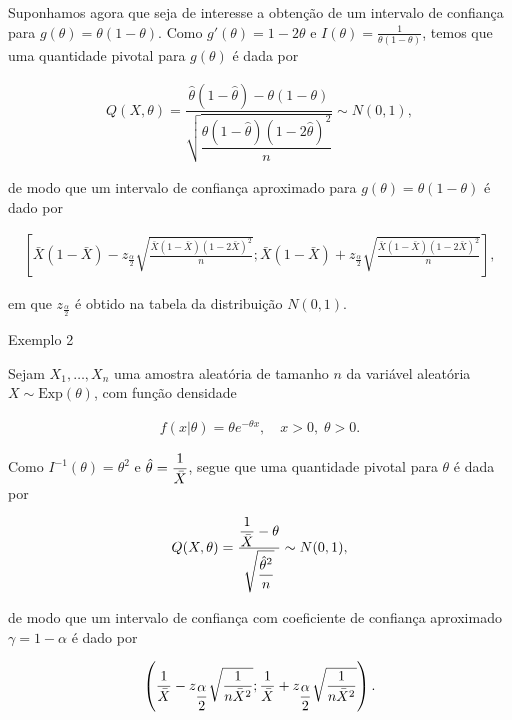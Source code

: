 \documentclass[12pt]{beamer}
\begin{document}
\begin{frame}{}
\begin{block}{}
\justifying
Suponhamos agora que seja de interesse a obtenção de um intervalo de confiança para $g(\theta) = \theta(1 - \theta)$. Como $g'(\theta) = 1 - 2\theta$ e $I(\theta) = \frac{1}{\theta(1 - \theta)}$, temos que uma quantidade pivotal para $g(\theta)$ é dada por

\begin{align*}
Q(X, \theta) = \dfrac{\hat{\theta}(1 - \hat{\theta}) - \theta(1 - \theta)}{\sqrt{\dfrac{\hat{\theta}(1-\hat{\theta})(1-2\hat{\theta})^2}{n}}} \sim N(0, 1),
\end{align*}

de modo que um intervalo de confiança aproximado para $g(\theta) = \theta(1-\theta)$ é dado por

{\footnotesize
\begin{align*}
\left[ \bar{X}(1 - \bar{X}) - z_{\frac{\alpha}{2}} \sqrt{\frac{\bar{X}(1 - \bar{X})(1 - 2\bar{X})^2}{n}} ; \bar{X}(1 - \bar{X}) + z_{\frac{\alpha}{2}} \sqrt{\frac{\bar{X}(1 - \bar{X})(1 - 2\bar{X})^2}{n}} \right],
\end{align*}
}

em que $z_{\frac{\alpha}{2}}$ é obtido na tabela da distribuição $N(0, 1)$.
\end{block}
\end{frame}

\begin{frame}{Exemplo 2}
\begin{block}{}
\justifying
Sejam $X_1, \ldots, X_n$ uma amostra aleatória de tamanho $n$ da variável aleatória $X \sim \text{Exp}(\theta)$, com função densidade

\begin{align*}
f(x|\theta) = \theta e^{-\theta x}, \quad x > 0, \; \theta > 0.
\end{align*}

Como $I^{-1}(\theta) = \theta^2$ e $\hat{\theta} = \dfrac{1}{\Bar{X}}$, segue que uma quantidade pivotal para $\theta$ é dada por

\begin{align*}
Q(X, \theta) = \dfrac{\dfrac{1}{\Bar{X}} - \theta}{\sqrt{\dfrac{\hat{\theta}^2}{n}}} \sim N(0, 1),
\end{align*}

\end{block}
\end{frame}

\begin{frame}{}
\begin{block}{}
\justifying
de modo que um intervalo de confiança com coeficiente de confiança aproximado $\gamma = 1 - \alpha$ é dado por

\begin{align*}
\left( \dfrac{1}{\Bar{X}} - z_{\dfrac{\alpha}{2}} \sqrt{\dfrac{1}{n\Bar{X}^2}} ; \dfrac{1}{\Bar{X}} + z_{\dfrac{\alpha}{2}} \sqrt{\dfrac{1}{n\Bar{X}^2}} \right).
\end{align*}
\end{block}
\nocite{bolfarine}
\end{frame}
\end{document}
